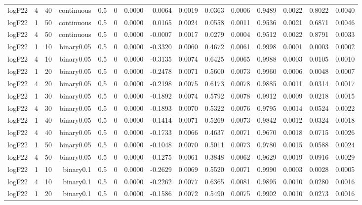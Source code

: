 \begin{longtable}{rrrrrrrrrrrrrrr}
  logF22 & 4 & 40 & continuous & 0.5 & 0 & 0.0000 & 0.0064 & 0.0019 & 0.0363 & 0.0006 & 0.9489 & 0.0022 & 0.8022 & 0.0040 \\ 
  logF22 & 1 & 50 & continuous & 0.5 & 0 & 0.0000 & 0.0165 & 0.0024 & 0.0558 & 0.0011 & 0.9536 & 0.0021 & 0.6871 & 0.0046 \\ 
  logF22 & 4 & 50 & continuous & 0.5 & 0 & 0.0000 & -0.0007 & 0.0017 & 0.0279 & 0.0004 & 0.9512 & 0.0022 & 0.8791 & 0.0033 \\ 
  logF22 & 1 & 10 & binary0.05 & 0.5 & 0 & 0.0000 & -0.3320 & 0.0060 & 0.4672 & 0.0061 & 0.9998 & 0.0001 & 0.0003 & 0.0002 \\ 
  logF22 & 4 & 10 & binary0.05 & 0.5 & 0 & 0.0000 & -0.3135 & 0.0074 & 0.6425 & 0.0065 & 0.9988 & 0.0003 & 0.0105 & 0.0010 \\ 
  logF22 & 1 & 20 & binary0.05 & 0.5 & 0 & 0.0000 & -0.2478 & 0.0071 & 0.5600 & 0.0073 & 0.9960 & 0.0006 & 0.0048 & 0.0007 \\ 
  logF22 & 4 & 20 & binary0.05 & 0.5 & 0 & 0.0000 & -0.2198 & 0.0075 & 0.6173 & 0.0078 & 0.9885 & 0.0011 & 0.0314 & 0.0017 \\ 
  logF22 & 1 & 30 & binary0.05 & 0.5 & 0 & 0.0000 & -0.1892 & 0.0074 & 0.5792 & 0.0078 & 0.9912 & 0.0009 & 0.0218 & 0.0015 \\ 
  logF22 & 4 & 30 & binary0.05 & 0.5 & 0 & 0.0000 & -0.1893 & 0.0070 & 0.5322 & 0.0076 & 0.9795 & 0.0014 & 0.0524 & 0.0022 \\ 
  logF22 & 1 & 40 & binary0.05 & 0.5 & 0 & 0.0000 & -0.1414 & 0.0071 & 0.5269 & 0.0073 & 0.9842 & 0.0012 & 0.0324 & 0.0018 \\ 
  logF22 & 4 & 40 & binary0.05 & 0.5 & 0 & 0.0000 & -0.1733 & 0.0066 & 0.4637 & 0.0071 & 0.9670 & 0.0018 & 0.0715 & 0.0026 \\ 
  logF22 & 1 & 50 & binary0.05 & 0.5 & 0 & 0.0000 & -0.1048 & 0.0070 & 0.5011 & 0.0073 & 0.9780 & 0.0015 & 0.0588 & 0.0024 \\ 
  logF22 & 4 & 50 & binary0.05 & 0.5 & 0 & 0.0000 & -0.1275 & 0.0061 & 0.3848 & 0.0062 & 0.9629 & 0.0019 & 0.0916 & 0.0029 \\ 
  logF22 & 1 & 10 & binary0.1 & 0.5 & 0 & 0.0000 & -0.2629 & 0.0069 & 0.5520 & 0.0071 & 0.9990 & 0.0003 & 0.0028 & 0.0005 \\ 
  logF22 & 4 & 10 & binary0.1 & 0.5 & 0 & 0.0000 & -0.2262 & 0.0077 & 0.6365 & 0.0081 & 0.9895 & 0.0010 & 0.0280 & 0.0016 \\ 
  logF22 & 1 & 20 & binary0.1 & 0.5 & 0 & 0.0000 & -0.1586 & 0.0072 & 0.5490 & 0.0075 & 0.9902 & 0.0010 & 0.0273 & 0.0016 \\ 

\end{longtable}
